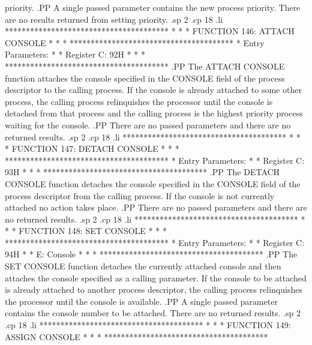 priority.
.PP
A single passed parameter contains the new process priority.  There
are no results returned from setting priority.
.sp 2
.cp 18
.li
***************************************
*                                     *
*  FUNCTION 146:  ATTACH CONSOLE      *
*                                     *
***************************************
*  Entry Parameters:                  *
*      Register   C:  92H             *
*                                     *
***************************************
.PP
The ATTACH CONSOLE function attaches the console
specified in the CONSOLE field of the process descriptor
to the calling process.  If the console is already attached to some
other process,
the calling process relinquishes the processor until the console
is detached from that process and the calling process is the highest
priority process waiting for the console.
.PP
There are no passed parameters and there are no returned results.
.sp 2
.cp 18
.li
***************************************
*                                     *
*  FUNCTION 147:  DETACH CONSOLE      *
*                                     *
***************************************
*  Entry Parameters:                  *
*      Register   C:  93H             *
*                                     *
***************************************
.PP
The DETACH CONSOLE function detaches the console
specified in the CONSOLE field of the process descriptor
from the calling process.  If the console is not currently attached
no action takes place.
.PP
There are no passed parameters and there are no returned results.
.sp 2
.cp 18
.li
***************************************
*                                     *
*  FUNCTION 148:  SET CONSOLE         *
*                                     *
***************************************
*  Entry Parameters:                  *
*      Register   C:  94H             *
*                 E:  Console         *
*                                     *
***************************************
.PP
The SET CONSOLE function detaches the currently
attached console and then attaches the console specified as a calling
parameter.  If the console to be attached is already attached to
another process descriptor, the calling process relinquishes the
processor until the console is available.
.PP
A single passed parameter contains the console number to be attached.
There are no returned results.
.sp 2
.cp 18
.li
***************************************
*                                     *
*  FUNCTION 149:  ASSIGN CONSOLE      *
*                                     *
***************************************
